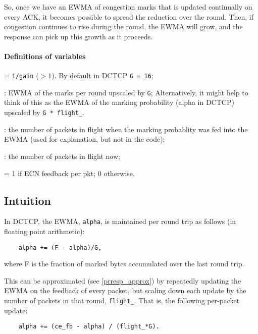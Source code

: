 So, once we have an EWMA of congestion marks that is updated continually on
every ACK, it becomes possible to spread the reduction over the round. Then,  if
congestion continues to rise during the round, the EWMA will grow, and the
response can pick up this growth as it proceeds.

\paragraph{Definitions of variables}
\begin{description}[nosep]
	\item [\texttt{G}] = \texttt{1/gain} (\(>1\)). By default in DCTCP \texttt{G = 16};
	\item [\texttt{av\_up}]: EWMA of the marks per round upscaled by \texttt{G};
	Alternatively, it might help to think of this as the EWMA of the marking
	probability (alpha in DCTCP) upscaled by \texttt{G * flight\_}. 
	\item [\texttt{flight\_}]: the number of packets in flight when the marking
	probablity was fed into the EWMA (used for explanation, but not in the code);
	\item [\texttt{flight}]: the number of packets in flight now;
	\item [\texttt{ce\_fb}] = 1 if ECN feedback per pkt; 0 otherwise.
\end{description}

\subsection{Intuition}\label{prresp_intuition}

In DCTCP, the EWMA, \texttt{alpha}, is maintained per round trip as follows (in
floating point arithmetic):
\begin{verbatim}
    alpha += (F - alpha)/G,
\end{verbatim}
where F is the fraction of marked bytes accumulated over the last round trip.

This can be approximated (see \autoref{prresp_approx}) by repeatedly updating
the EWMA on the feedback of every packet, but scaling down each update by the
number of packets in that round, \texttt{flight\_}. That is, the following
per-packet update:
\begin{verbatim}
    alpha += (ce_fb - alpha) / (flight_*G).
\end{verbatim}

